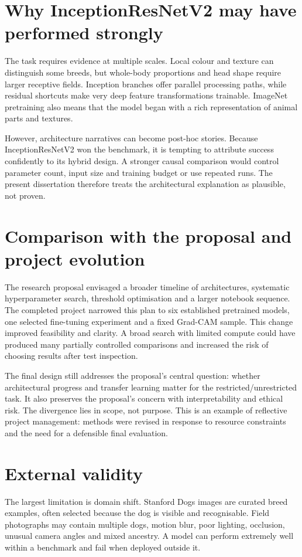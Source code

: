 \section{Why InceptionResNetV2 may have performed strongly}
The task requires evidence at multiple scales. Local colour and texture can distinguish some breeds, but whole-body proportions and head shape require larger receptive fields. Inception branches offer parallel processing paths, while residual shortcuts make very deep feature transformations trainable. ImageNet pretraining also means that the model began with a rich representation of animal parts and textures.

However, architecture narratives can become post-hoc stories. Because InceptionResNetV2 won the benchmark, it is tempting to attribute success confidently to its hybrid design. A stronger causal comparison would control parameter count, input size and training budget or use repeated runs. The present dissertation therefore treats the architectural explanation as plausible, not proven.

\section{Comparison with the proposal and project evolution}
The research proposal envisaged a broader timeline of architectures, systematic hyperparameter search, threshold optimisation and a larger notebook sequence. The completed project narrowed this plan to six established pretrained models, one selected fine-tuning experiment and a fixed Grad-CAM sample. This change improved feasibility and clarity. A broad search with limited compute could have produced many partially controlled comparisons and increased the risk of choosing results after test inspection.

The final design still addresses the proposal's central question: whether architectural progress and transfer learning matter for the restricted/unrestricted task. It also preserves the proposal's concern with interpretability and ethical risk. The divergence lies in scope, not purpose. This is an example of reflective project management: methods were revised in response to resource constraints and the need for a defensible final evaluation.

\section{External validity}
The largest limitation is domain shift. Stanford Dogs images are curated breed examples, often selected because the dog is visible and recognisable. Field photographs may contain multiple dogs, motion blur, poor lighting, occlusion, unusual camera angles and mixed ancestry. A model can perform extremely well within a benchmark and fail when deployed outside it.

